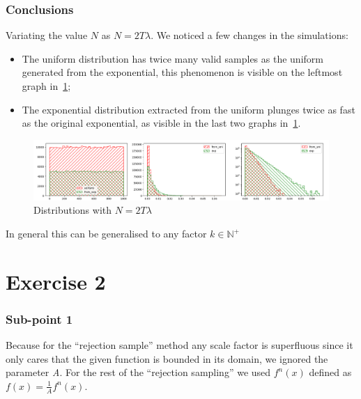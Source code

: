 \documentclass[10pt,a4paper]{article}
\begin{document}
\subsubsection*{Conclusions}


Variating the value \(N\) as \(N=2T\lambda\). We noticed a few changes in the simulations:
\begin{itemize}
\item The uniform distribution has twice many valid samples as the uniform generated from the exponential, this phenomenon is visible on the leftmost graph in~\ref{fig:3};
\item The exponential distribution extracted from the uniform plunges twice as fast as the original exponential, as visible in the last two graphs in~\ref{fig:3}.
\end{itemize}

\begin{figure}[h]
  \includegraphics[scale=0.4]{es1-3.png}
  \caption{Distributions with \(N=2T\lambda\)}
  \label{fig:3}
\end{figure}

In general this can be generalised to any factor \(k\in\mathbb{N}^{+}\)

\section*{Exercise 2}

\subsubsection*{Sub-point 1}

Because for the ``rejection sample'' method any scale factor is superfluous since it only cares that the given function is bounded in its domain, we ignored the parameter \emph{A}. For the rest of the ``rejection sampling'' we used \(f^{n}(x)\) defined as \(f(x) = \frac{1}{A}f^{n}(x)\).
\end{document}
